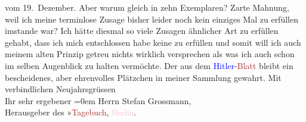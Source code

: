                vom 19. Dezember. Aber warum gleich in zehn Exemplaren? Zarte Mahnung,
               weil ich meine terminlose Zusage bisher leider noch kein einziges Mal zu erfüllen
               imstande war? Ich hätte diesmal so viele Zusagen ähnlicher Art zu erfüllen gehabt,
               dass ich mich entschlossen habe keine zu erfüllen und somit will ich auch meinem
               alten Prinzip getreu nichts wirklich versprechen als was ich auch schon im selben
               Augenblick zu halten vermöchte.\pend
           \pstart
           Der \label{K_L02459_2v}\label{K_L02459_2h} aus dem \textcolor{blue}{Hitler}{}\ledrightnote{\textcolor{blue}{Adolf Hitler}}-\textcolor{brown}{Blatt}{}
               bleibt ein bescheidenes, aber ehrenvolles Plätzchen in meiner Sammlung gewahrt.\pend
           \pstart
           Mit verbindlichen Neujahrsgrüssen{\\[\baselineskip]}Ihr sehr ergebener\pend
           \leftskip=0em{}{\bigskip}\pstart
           \noindent{}Herrn Stefan Grossmann,{\\}Herausgeber des »\textcolor{brown}{Tagebuch}{}\ledrightnote{\textcolor{brown}{Das Tage-Buch}}\label{T_L02459_1v}\label{T_L02459_1h}, \textcolor{pink}{Berlin}{}\ledrightnote{\textcolor{pink}{Berlin}}.\pend
           \endnumbering{}  
      